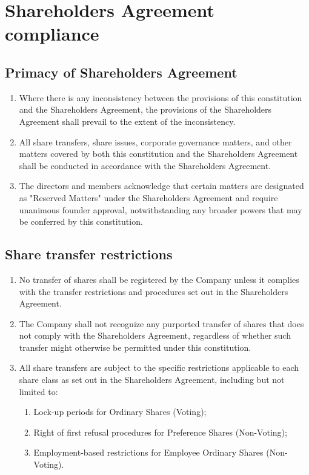 \section{Shareholders Agreement compliance}

\subsection{Primacy of Shareholders Agreement}

\begin{enumerate}[label=(\alph*)]
    \item Where there is any inconsistency between the provisions of this constitution and the Shareholders Agreement, the provisions of the Shareholders Agreement shall prevail to the extent of the inconsistency.
    
    \item All share transfers, share issues, corporate governance matters, and other matters covered by both this constitution and the Shareholders Agreement shall be conducted in accordance with the Shareholders Agreement.
    
    \item The directors and members acknowledge that certain matters are designated as "Reserved Matters" under the Shareholders Agreement and require unanimous founder approval, notwithstanding any broader powers that may be conferred by this constitution.
\end{enumerate}

\subsection{Share transfer restrictions}

\begin{enumerate}[label=(\alph*)]
    \item No transfer of shares shall be registered by the Company unless it complies with the transfer restrictions and procedures set out in the Shareholders Agreement.
    
    \item The Company shall not recognize any purported transfer of shares that does not comply with the Shareholders Agreement, regardless of whether such transfer might otherwise be permitted under this constitution.
    
    \item All share transfers are subject to the specific restrictions applicable to each share class as set out in the Shareholders Agreement, including but not limited to:
    \begin{enumerate}[label=(\roman*)]
        \item Lock-up periods for Ordinary Shares (Voting);
        \item Right of first refusal procedures for Preference Shares (Non-Voting);
        \item Employment-based restrictions for Employee Ordinary Shares (Non-Voting).
    \end{enumerate}
\end{enumerate}

